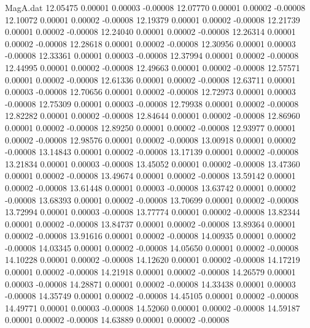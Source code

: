 \begin{filecontents}{MagA.dat}
  12.05475    0.00001    0.00003   -0.00008
  12.07770    0.00001    0.00002   -0.00008
  12.10072    0.00001    0.00002   -0.00008
  12.19379    0.00001    0.00002   -0.00008
  12.21739    0.00001    0.00002   -0.00008
  12.24040    0.00001    0.00002   -0.00008
  12.26314    0.00001    0.00002   -0.00008
  12.28618    0.00001    0.00002   -0.00008
  12.30956    0.00001    0.00003   -0.00008
  12.33361    0.00001    0.00003   -0.00008
  12.37994    0.00001    0.00002   -0.00008
  12.44995    0.00001    0.00002   -0.00008
  12.49663    0.00001    0.00002   -0.00008
  12.57571    0.00001    0.00002   -0.00008
  12.61336    0.00001    0.00002   -0.00008
  12.63711    0.00001    0.00003   -0.00008
  12.70656    0.00001    0.00002   -0.00008
  12.72973    0.00001    0.00003   -0.00008
  12.75309    0.00001    0.00003   -0.00008
  12.79938    0.00001    0.00002   -0.00008
  12.82282    0.00001    0.00002   -0.00008
  12.84644    0.00001    0.00002   -0.00008
  12.86960    0.00001    0.00002   -0.00008
  12.89250    0.00001    0.00002   -0.00008
  12.93977    0.00001    0.00002   -0.00008
  12.98576    0.00001    0.00002   -0.00008
  13.00918    0.00001    0.00002   -0.00008
  13.14843    0.00001    0.00002   -0.00008
  13.17139    0.00001    0.00002   -0.00008
  13.21834    0.00001    0.00003   -0.00008
  13.45052    0.00001    0.00002   -0.00008
  13.47360    0.00001    0.00002   -0.00008
  13.49674    0.00001    0.00002   -0.00008
  13.59142    0.00001    0.00002   -0.00008
  13.61448    0.00001    0.00003   -0.00008
  13.63742    0.00001    0.00002   -0.00008
  13.68393    0.00001    0.00002   -0.00008
  13.70699    0.00001    0.00002   -0.00008
  13.72994    0.00001    0.00003   -0.00008
  13.77774    0.00001    0.00002   -0.00008
  13.82344    0.00001    0.00002   -0.00008
  13.84737    0.00001    0.00002   -0.00008
  13.89364    0.00001    0.00002   -0.00008
  13.91616    0.00001    0.00002   -0.00008
  14.00935    0.00001    0.00002   -0.00008
  14.03345    0.00001    0.00002   -0.00008
  14.05650    0.00001    0.00002   -0.00008
  14.10228    0.00001    0.00002   -0.00008
  14.12620    0.00001    0.00002   -0.00008
  14.17219    0.00001    0.00002   -0.00008
  14.21918    0.00001    0.00002   -0.00008
  14.26579    0.00001    0.00003   -0.00008
  14.28871    0.00001    0.00002   -0.00008
  14.33438    0.00001    0.00003   -0.00008
  14.35749    0.00001    0.00002   -0.00008
  14.45105    0.00001    0.00002   -0.00008
  14.49771    0.00001    0.00003   -0.00008
  14.52060    0.00001    0.00002   -0.00008
  14.59187    0.00001    0.00002   -0.00008
  14.63889    0.00001    0.00002   -0.00008

\end{filecontents}
